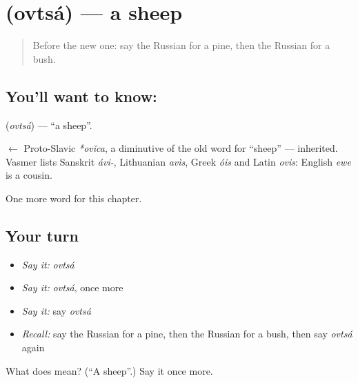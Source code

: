 \section[\texorpdfstring{\ru{овца} (ovtsá)}{овца (ovtsá)}]{ (ovtsá) — a sheep}

\label{lesson:RU-C224-ovtsa}



\begin{quote}
Before the new one: say the Russian for a pine, then the Russian for a bush.
\end{quote}

\subsection*{You'll want to know: }
\textbf{} (\emph{ovtsá}) — \textquotedblleft{}a sheep\textquotedblright{}.

\begin{cousinweb}
\textbf{} $\leftarrow$ Proto-Slavic \emph{*ovĭca}, a diminutive of the old word for \textquotedblleft{}sheep\textquotedblright{} — inherited. Vasmer lists Sanskrit \emph{ávi-}, Lithuanian \emph{avìs}, Greek \emph{óis} and Latin \emph{ovis}: English \emph{ewe} is a cousin.
\end{cousinweb}

\begin{grammarlens}[title={What you've built}]
One more word for this chapter.
\end{grammarlens}

\subsection*{Your turn}
\begin{itemize}
\raggedright
  \item \emph{Say it:} \emph{ovtsá}
  \item \emph{Say it:} \emph{ovtsá}, once more
  \item \emph{Say it:} say \emph{ovtsá}
  \item \emph{Recall:} say the Russian for a pine, then the Russian for a bush, then say \emph{ovtsá} again
\end{itemize}

\begin{tcolorbox}[breakable,colback=teal!4,colframe=teal!35!black,title={Before you move on}]
What does  mean? (\textquotedblleft{}A sheep\textquotedblright{}.) Say it once more.
\end{tcolorbox}
